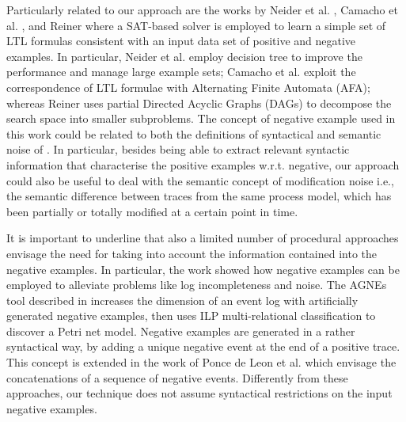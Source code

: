 Particularly related to our approach are the works by Neider et al. \cite{2018-Neider}, Camacho et al. \cite{2019-Camacho}, and Reiner \cite{2019-Riener} where a SAT-based solver is employed to learn a simple set of LTL formulas consistent with an input data set of positive and negative examples. In particular, Neider et al. \cite{2018-Neider} employ decision tree to improve the performance and manage large example sets; Camacho et al. \cite{2019-Camacho} exploit the correspondence of LTL formulae with Alternating Finite Automata (AFA); whereas Reiner uses partial Directed Acyclic Graphs (DAGs) to decompose the search space into smaller subproblems.
The concept of negative example used in this work could be related to both the definitions of syntactical and semantic noise of \cite{2009-Gunther}. In particular, besides being able to extract relevant syntactic information that characterise the positive examples w.r.t. negative, our approach could also be useful to deal with the semantic concept of modification noise i.e., the semantic difference between traces from the same process model, which has been partially or totally modified at a certain point in time. %
 
It is important to underline that also a limited number of procedural approaches envisage the need for taking into account the information contained into the negative examples. 
In particular, the work \cite{2015-Ponce} showed how negative examples can be employed to alleviate problems like log incompleteness and noise.
The AGNEs tool described in \cite{2009-Goedertier} increases the dimension of an event log with artificially generated negative examples, then uses \ac{ILP} multi-relational classification to discover a Petri net model. 
Negative examples are generated in a rather syntactical way, by adding a unique negative event at the end of a positive trace. This concept is extended in the work of Ponce de Leon et al. \cite{2018-Ponce} which envisage the concatenations of a sequence of negative events. Differently from these approaches, our technique does not assume syntactical restrictions on the input negative examples.


